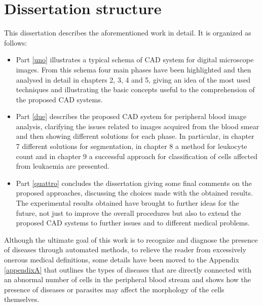 \documentclass[final,a4paper,12pt,english]{UnicaPhdThesis3}
\begin{document}
\section{Dissertation structure} %
This dissertation describes the aforementioned work in detail. It is organized as follows:
\begin{itemize}
\item Part \ref{uno} illustrates a typical schema of CAD system for digital microscope images. From this schema four main phases have been highlighted and then analysed in detail in chapters 2, 3, 4 and 5, giving an idea of the most used techniques and illustrating the basic concepts useful to the comprehension of the proposed CAD systems. 

\item Part \ref{due} describes the proposed CAD system for peripheral blood image analysis, clarifying the issues related to images acquired from the blood smear and then showing different solutions for each phase. In particular, in chapter 7 different solutions for segmentation, in chapter 8 a method for leukocyte count and in chapter 9 a successful approach for classification of cells affected from leukaemia are presented. 
\item Part \ref{quattro} concludes the dissertation giving some final comments on the proposed approaches, discussing the choices made with the obtained results. The experimental results obtained have brought to further ideas for the future, not just to improve the overall procedures but also to extend the proposed CAD systems to further issues and to different medical problems. 
\end{itemize}
Although the ultimate goal of this work is to recognize and diagnose the presence of diseases through automated methods, to relieve the reader from excessively onerous medical definitions, some details have been moved to the Appendix \ref{appendixA} that outlines the types of diseases that are directly connected with an abnormal number of cells in the peripheral blood stream and shows how the presence of diseases or parasites may affect the morphology of the cells themselves.
\end{document}
